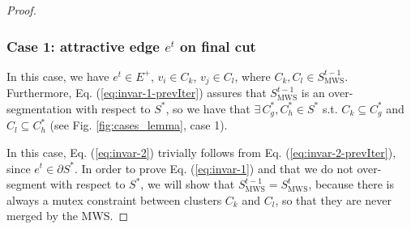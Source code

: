 \begin{proof}





\subsubsection*{Case 1: attractive edge $e^t$ on final cut}
In this case, we have $e^{t}\in E^{+}$, $v_{i}\in C_{k}$,
$v_{j}\in C_{l}$, where $C_{k},C_{l}\in S_{\mathrm{MWS}}^{t-1}$. Furthermore, Eq. (\ref{eq:invar-1-prevIter}) assures that $S_{\mathrm{MWS}}^{t-1}$ is an over-segmentation with respect to $S^*$, so we have that $\exists \,C^*_g, C^*_h \in S^*$ s.t. $C_k \subseteq C^*_g$ and $C_l \subseteq C^*_h$ (see Fig. \ref{fig:cases_lemma}, case 1).  


In this case, Eq. (\ref{eq:invar-2}) trivially follows from Eq. (\ref{eq:invar-2-prevIter}), since $e^t \in \partial S^*$.
In order to prove Eq. (\ref{eq:invar-1}) and that we do not over-segment with respect to $S^*$, we will show that $S_{\mathrm{MWS}}^{t-1} = S_{\mathrm{MWS}}^{t}$, because there is always a mutex constraint between clusters $C_{k}$ and $C_{l}$, so that they are never merged by the MWS.



\end{proof}
